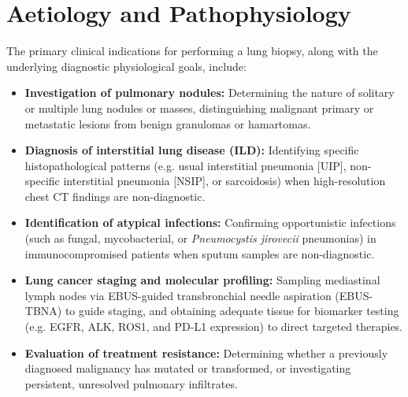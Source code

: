 \section*{Aetiology and Pathophysiology}
The primary clinical indications for performing a lung biopsy, along with the underlying diagnostic physiological goals, include:
\begin{itemize}
    \item \textbf{Investigation of pulmonary nodules:} Determining the nature of solitary or multiple lung nodules or masses, distinguishing malignant primary or metastatic lesions from benign granulomas or hamartomas.
    \item \textbf{Diagnosis of interstitial lung disease (ILD):} Identifying specific histopathological patterns (e.g. usual interstitial pneumonia [UIP], non-specific interstitial pneumonia [NSIP], or sarcoidosis) when high-resolution chest CT findings are non-diagnostic.
    \item \textbf{Identification of atypical infections:} Confirming opportunistic infections (such as fungal, mycobacterial, or \textit{Pneumocystis jirovecii} pneumonias) in immunocompromised patients when sputum samples are non-diagnostic.
    \item \textbf{Lung cancer staging and molecular profiling:} Sampling mediastinal lymph nodes via EBUS-guided transbronchial needle aspiration (EBUS-TBNA) to guide staging, and obtaining adequate tissue for biomarker testing (e.g. EGFR, ALK, ROS1, and PD-L1 expression) to direct targeted therapies.
    \item \textbf{Evaluation of treatment resistance:} Determining whether a previously diagnosed malignancy has mutated or transformed, or investigating persistent, unresolved pulmonary infiltrates.
\end{itemize}

